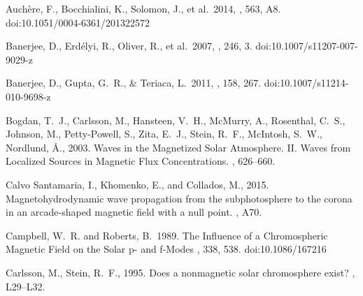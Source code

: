 \documentclass[linenumbers]{aastex63}
\newcommand\aastex{AAS\TeX}
\begin{document}


\begin{thebibliography}{}

 Auch{\`e}re, F., Bocchialini, K., Solomon, J., et al.\ 2014, \aap, 563, A8. doi:10.1051/0004-6361/201322572

 Banerjee, D., Erd{\'e}lyi, R., Oliver, R., et al.\ 2007, \solphys, 246, 3. doi:10.1007/s11207-007-9029-z

 Banerjee, D., Gupta, G.~R., \& Teriaca, L.\ 2011, \ssr, 158, 267. doi:10.1007/s11214-010-9698-z

{Bogdan}, T.~J., {Carlsson}, M., {Hansteen}, V.~H., {McMurry}, A., {Rosenthal},
  C.~S., {Johnson}, M., {Petty-Powell}, S., {Zita}, E.~J., {Stein}, R.~F.,
  {McIntosh}, S.~W., {Nordlund}, {\AA}., 2003. {Waves in the Magnetized Solar
  Atmosphere. II. Waves from Localized Sources in Magnetic Flux
  Concentrations}. , 626--660.

 {Calvo Santamaria}, I., {Khomenko}, E.,  and {Collados}, M., 2015. {Magnetohydrodynamic wave propagation from the subphotosphere to the corona in an arcade-shaped magnetic field with a null point}. , A70.


 {Campbell}, W.~R. and {Roberts}, B.\ 1989. {The Influence of a Chromospheric Magnetic Field on the Solar p- and f-Modes} \apj, 338, 538. doi:10.1086/167216

{Carlsson}, M., {Stein}, R.~F., 1995. {Does a nonmagnetic solar chromosphere
  exist?} , L29--L32.


\end{thebibliography}
\end{document}
